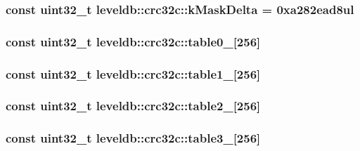 \subsubsection[{k\+Mask\+Delta}]{\setlength{\rightskip}{0pt plus 5cm}const {\bf uint32\+\_\+t} leveldb\+::crc32c\+::k\+Mask\+Delta = 0xa282ead8ul\hspace{0.3cm}{\ttfamily [static]}}\label{namespaceleveldb_1_1crc32c_ae1bd49dbeac3e469a5a4347989f2e8b3}
\hypertarget{namespaceleveldb_1_1crc32c_ade0c8f1e2098799a8924d05b30411817}{}
\subsubsection[{table0\+\_\+}]{\setlength{\rightskip}{0pt plus 5cm}const {\bf uint32\+\_\+t} leveldb\+::crc32c\+::table0\+\_\+\mbox{[}256\mbox{]}\hspace{0.3cm}{\ttfamily [static]}}\label{namespaceleveldb_1_1crc32c_ade0c8f1e2098799a8924d05b30411817}
\hypertarget{namespaceleveldb_1_1crc32c_af456bfb794e6108a828e5d3a2a58700c}{}
\subsubsection[{table1\+\_\+}]{\setlength{\rightskip}{0pt plus 5cm}const {\bf uint32\+\_\+t} leveldb\+::crc32c\+::table1\+\_\+\mbox{[}256\mbox{]}\hspace{0.3cm}{\ttfamily [static]}}\label{namespaceleveldb_1_1crc32c_af456bfb794e6108a828e5d3a2a58700c}
\hypertarget{namespaceleveldb_1_1crc32c_af5be8e058bd89cbd43972aa986910599}{}
\subsubsection[{table2\+\_\+}]{\setlength{\rightskip}{0pt plus 5cm}const {\bf uint32\+\_\+t} leveldb\+::crc32c\+::table2\+\_\+\mbox{[}256\mbox{]}\hspace{0.3cm}{\ttfamily [static]}}\label{namespaceleveldb_1_1crc32c_af5be8e058bd89cbd43972aa986910599}
\hypertarget{namespaceleveldb_1_1crc32c_a212c50cb25082d3d84471483d26ac2f5}{}
\subsubsection[{table3\+\_\+}]{\setlength{\rightskip}{0pt plus 5cm}const {\bf uint32\+\_\+t} leveldb\+::crc32c\+::table3\+\_\+\mbox{[}256\mbox{]}\hspace{0.3cm}{\ttfamily [static]}}\label{namespaceleveldb_1_1crc32c_a212c50cb25082d3d84471483d26ac2f5}
